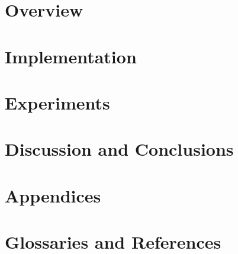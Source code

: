 \documentclass[\mytextsize, a4paper, twoside, openany]{memoir}
\begin{document}
\frontmatter


\mainmatter
\part{Overview}
\label{pt:overview}



\part{Implementation}
\label{pt:implementation}


\part{Experiments}
\label{pt:experiments}

\label{pt:results}


\part{Discussion and Conclusions}


\part{Appendices}
\label{pt:appendices}


\part{Glossaries and References}
\label{pt:backmatter}
\backmatter

\end{document}

